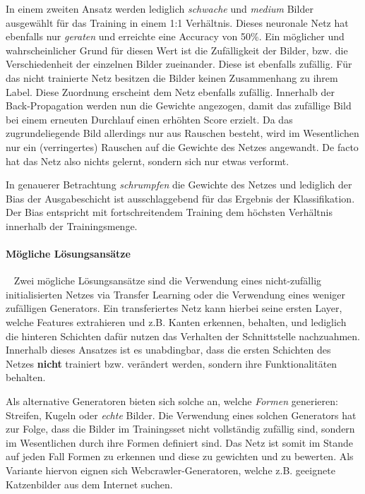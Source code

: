 In einem zweiten Ansatz werden lediglich \textit{schwache} und \textit{medium} Bilder ausgewählt für das Training in einem 1:1 Verhältnis. Dieses neuronale Netz hat ebenfalls nur \textit{geraten} und erreichte eine Accuracy von 50\%. Ein möglicher und wahrscheinlicher Grund für diesen Wert ist die Zufälligkeit der Bilder, bzw. die Verschiedenheit der einzelnen Bilder zueinander. Diese ist ebenfalls zufällig. Für das nicht trainierte Netz besitzen die Bilder keinen Zusammenhang zu ihrem Label. Diese Zuordnung erscheint dem Netz ebenfalls zufällig. Innerhalb der Back-Propagation \cite{zhou_understanding_2018} werden nun die Gewichte angezogen, damit das zufällige Bild bei einem erneuten Durchlauf einen erhöhten Score erzielt. Da das zugrundeliegende Bild allerdings nur aus Rauschen besteht, wird im Wesentlichen nur ein (verringertes) Rauschen auf die Gewichte des Netzes angewandt. De facto hat das Netz also nichts gelernt, sondern sich nur etwas verformt. 

In genauerer Betrachtung \textit{schrumpfen} die Gewichte des Netzes und lediglich der Bias der Ausgabeschicht ist ausschlaggebend für das Ergebnis der Klassifikation. Der Bias entspricht mit fortschreitendem Training dem höchsten Verhältnis innerhalb der Trainingsmenge.

\paragraph{Mögliche Lösungsansätze}~\newline
Zwei mögliche Lösungsansätze sind die Verwendung eines nicht-zufällig initialisierten Netzes via Transfer Learning \cite{5288526} oder die Verwendung eines weniger zufälligen Generators. Ein transferiertes Netz kann hierbei seine ersten Layer, welche Features extrahieren und z.B. Kanten erkennen, behalten, und lediglich die hinteren Schichten dafür nutzen das Verhalten der Schnittstelle nachzuahmen. Innerhalb dieses Ansatzes ist es unabdingbar, dass die ersten Schichten des Netzes \textbf{nicht} trainiert bzw. verändert werden, sondern ihre Funktionalitäten behalten. 

Als alternative Generatoren bieten sich solche an, welche \textit{Formen} generieren: Streifen, Kugeln oder \textit{echte} Bilder. Die Verwendung eines solchen Generators hat zur Folge, dass die Bilder im Trainingsset nicht vollständig zufällig sind, sondern im Wesentlichen durch ihre Formen definiert sind. Das Netz ist somit im Stande auf jeden Fall Formen zu erkennen und diese zu gewichten und zu bewerten. Als Variante hiervon eignen sich Webcrawler-Generatoren, welche z.B. geeignete Katzenbilder aus dem Internet suchen.   